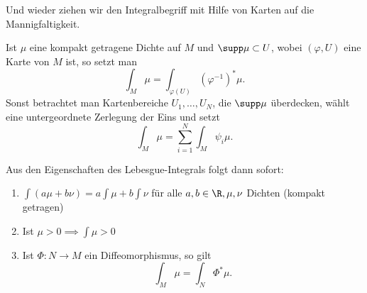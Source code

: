 Und wieder ziehen wir den Integralbegriff mit Hilfe von Karten auf die Mannigfaltigkeit.

\begin{defn}\autolabel{}
	Ist $\mu$ eine kompakt getragene Dichte auf $M$ und \( \supp\mu \subset U \), wobei \( (\varphi,U) \) eine Karte von $M$ ist, so setzt man
	\[ \int_M\mu = \int_{\varphi(U)} \left( \varphi^{-1} \right)^*\mu. \]
	Sonst betrachtet man Kartenbereiche \( U_1,\dotsc,U_N \), die \( \supp \mu \) überdecken, wählt eine untergeordnete Zerlegung der Eins und setzt
	\[ \int_M \mu = \sum_{i=1}^N \int_M \psi_i\mu. \]
\end{defn}

Aus den Eigenschaften des Lebesgue-Integrals folgt dann sofort:

\begin{lem}\autolabel
	\begin{enumerate}[label={\roman*})]
		\item \( \int (a\mu + b\nu) = a\int \mu + b \int\nu \) für alle \( a,b \in \R, \mu,\nu \) Dichten (kompakt getragen)
		\item Ist \( \mu > 0 \implies \int \mu > 0 \)
		\item Ist \( \Phi: N \to M \) ein Diffeomorphismus, so gilt 
			\[ \int_M \mu = \int_N \Phi^*\mu. \]
	\end{enumerate}
\end{lem}